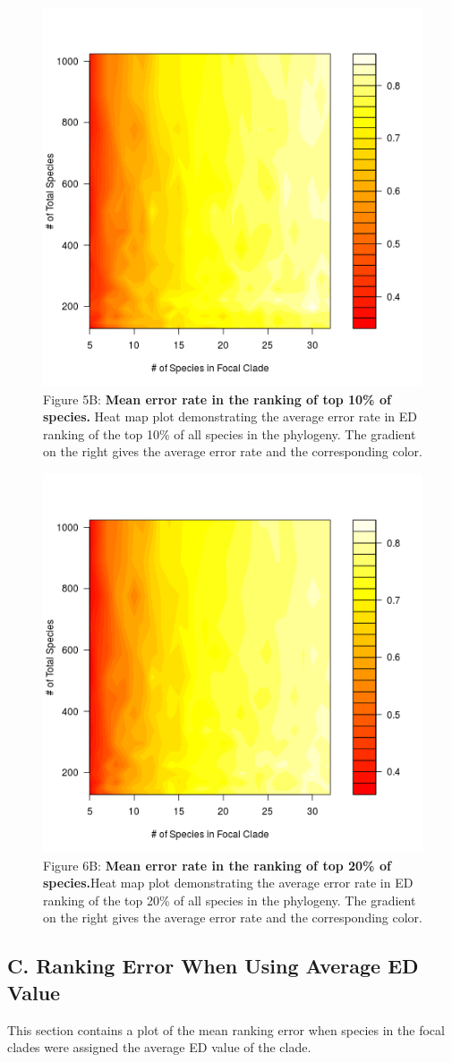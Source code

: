 \documentclass[12pt,english]{article}
\begin{document}
\begin{figure}[!ht]
  \center
  \includegraphics[width=.5\textwidth]{errorRate10pct.png}
  \caption*{Figure 5B: \textbf{Mean error rate in the ranking of top 10\% of species.} Heat
  map plot demonstrating the average error rate in ED ranking of the top 10\% of
  all species in the phylogeny. The gradient on the right gives the average
  error rate and the corresponding color.}
\end{figure}

\begin{figure}[!ht]
  \center
  \includegraphics[width=.5\textwidth]{errorRate20pct.png}
  \caption*{Figure 6B: \textbf{Mean error rate in the ranking of top 20\% of species.}Heat
  map plot demonstrating the average error rate in ED ranking of the top 20\% of
  all species in the phylogeny. The gradient on the right gives the average
  error rate and the corresponding color.}
\end{figure}
\clearpage
\subsection*{C. Ranking Error When Using Average ED Value}

This section contains a plot of the mean ranking error when species in the focal
clades were assigned the average ED value of the clade.
\end{document}
